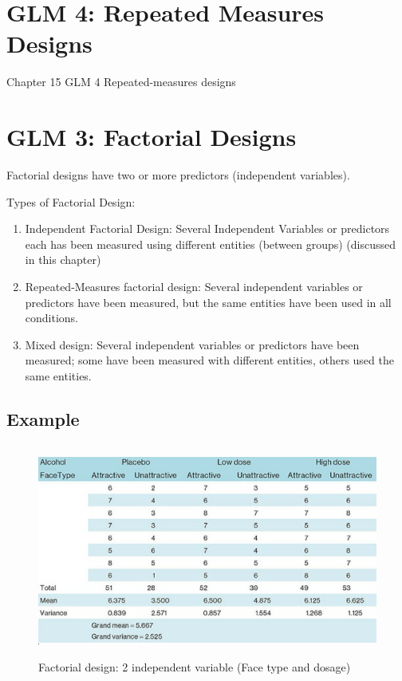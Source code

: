\documentclass[a4paper, 12pt]{book}
\begin{document}
\chapter{GLM 4: Repeated Measures Designs}
{Chapter 15 GLM 4 Repeated-measures designs}

\chapter{GLM 3: Factorial Designs}
Factorial designs have two or more predictors (independent variables).

Types of Factorial Design:
\begin{enumerate}
\item Independent Factorial Design: Several Independent Variables or predictors each has been measured using different entities (between groups) (discussed in this chapter)
\item Repeated-Measures factorial design: Several independent variables or predictors have been measured, but the same entities have been used in all conditions. 
\item Mixed design: Several independent variables or predictors have been measured; some have been measured with different entities, others used the same entities.
\end{enumerate}

\section{Example}
\begin{figure}[h]
	\includegraphics[width=1\textwidth,height=70mm]{Chapter 14 GLM 3 Factorial Designs/beergoggleeffect.PNG}
	\caption{Factorial design: 2 independent variable (Face type and dosage) }
\end{figure}
\end{document}
